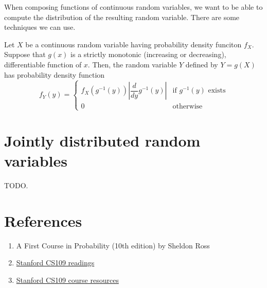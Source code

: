 \documentclass{article}
\begin{document}
When composing functions of continuous random variables, we want to be able to compute the distribution of the resulting random variable.
There are some techniques we can use.

\begin{theorem}
  Let $X$ be a continuous random variable having probability density funciton $f_X$.
  Suppose that $g(x)$ is a strictly monotonic (increasing or decreasing), differentiable function of $x$.
  Then, the random variable $Y$ defined by $Y = g(X)$ has probability density function
  \[
    f_Y(y) = \begin{cases}
      f_X(g^{-1}(y)) \left| \dfrac{d}{dy} g^{-1}(y) \right| & \text{if } g^{-1}(y) \text{ exists} \\
      0                                                     & \text{otherwise}
    \end{cases}
  \]
\end{theorem}

\section{Jointly distributed random variables}

TODO.

\section{References}

\begin{enumerate}
  \item A First Course in Probability (10th edition) by Sheldon Ross
  \item \href{https://chrispiech.github.io/probabilityForComputerScientists/en/}{Stanford CS109 readings}
  \item \href{https://web.stanford.edu/class/archive/cs/cs109/cs109.1234/}{Stanford CS109 course resources}
\end{enumerate}
\end{document}
